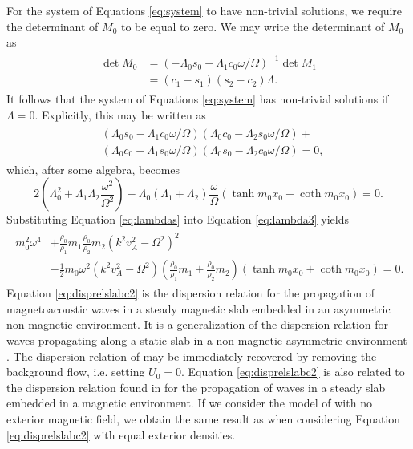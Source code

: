 For the system of Equations \eqref{eq:system} to have non-trivial solutions, we require the determinant of $M_0$ to be equal to zero.
We may write the determinant of $M_0$ as
%
\begin{align}
\begin{split}
\label{eq:det}
\det M_0 & = (- \Lambda_0 s_0 + \Lambda_1 c_0 \omega/\Omega)^{-1} \det M_1
\\
& = (c_1 - s_1) (s_2 - c_2) \Lambda.
\end{split}
\end{align}
%
It follows that the system of Equations \eqref{eq:system} has non-trivial solutions if $\Lambda = 0$.
Explicitly, this may be written as
%
\begin{align}
\begin{split}
\label{eq:lambda2}
& \left(\Lambda_0 s_0 - \Lambda_1 c_0 \omega/\Omega \right)
\left(\Lambda_0 c_0 - \Lambda_2 s_0 \omega/\Omega \right) +
\\
& \left(\Lambda_0 c_0 - \Lambda_1 s_0 \omega/\Omega \right)
\left( \Lambda_0 s_0 - \Lambda_2 c_0 \omega/\Omega \right) = 0,
\end{split}
\end{align}
%
which, after some algebra, becomes
%
\begin{equation}
\label{eq:lambda3}
2 \left( \Lambda_0^2 + \Lambda_1 \Lambda_2 \frac{\omega^2}{\Omega^2} \right)
- \Lambda_0 (\Lambda_1 + \Lambda_2) \frac{\omega}{\Omega} ( \tanh m_0 x_0 + \coth m_0 x_0 ) = 0.
\end{equation}
%
Substituting Equation \eqref{eq:lambdas} into Equation \eqref{eq:lambda3} yields
%
\begin{align}
\label{eq:disprelslabc2}
\begin{split}
m_0^2 \omega^4
& + \frac{\rho_0}{\rho_1} m_1 \frac{\rho_0}{\rho_2} m_2 ( k^2 v_A^2 - \Omega^2 )^2
\\[0.3cm]
& - \frac{1}{2} m_0 \omega^2 ( k^2 v_A^2 - \Omega^2) \left( \frac{\rho_0}{\rho_1} m_1 + \frac{\rho_0}{\rho_2} m_2 \right) \left( \tanh m_0 x_0 + \coth m_0 x_0 \right) = 0.
\end{split}
\end{align}
%
Equation \eqref{eq:disprelslabc2} is the dispersion relation for the propagation of magnetoacoustic waves in a steady magnetic slab embedded in an asymmetric non-magnetic environment.
It is a generalization of the dispersion relation for waves propagating along a static slab in a non-magnetic asymmetric environment \citep{Allcock2017}.
The dispersion relation of \cite{Allcock2017} may be immediately recovered by removing the background flow, i.e. setting $U_0 = 0$.
Equation \eqref{eq:disprelslabc2} is also related to the dispersion relation found in \cite{Nakariakov1995} for the propagation of waves in a steady slab embedded in a magnetic environment.
If we consider the model of \cite{Nakariakov1995} with no exterior magnetic field, we obtain the same result as when considering Equation \eqref{eq:disprelslabc2} with equal exterior densities.



